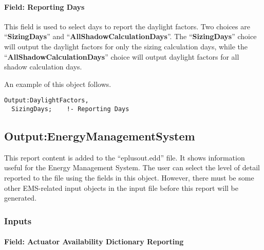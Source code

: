 \paragraph{Field: Reporting Days}\label{field-reporting-days}

This field is used to select days to report the daylight factors. Two choices are ``\textbf{SizingDays}'' and ``\textbf{AllShadowCalculationDays}''. The ``\textbf{SizingDays}'' choice will output the daylight factors for only the sizing calculation days, while the ``\textbf{AllShadowCalculationDays}'' choice will output daylight factors for all shadow calculation days.

An example of this object follows.

\begin{lstlisting}
Output:DaylightFactors,
  SizingDays;    !- Reporting Days
\end{lstlisting}

\subsection{Output:EnergyManagementSystem}\label{outputenergymanagementsystem}

This report content is added to the ``eplusout.edd'' file. It shows information useful for the Energy Management System. The user can select the level of detail reported to the file using the fields in this object. However, there must be some other EMS-related input objects in the input file before this report will be generated.

\subsubsection{Inputs}\label{inputs-5-024}

\paragraph{Field: Actuator Availability Dictionary Reporting}\label{field-actuator-availability-dictionary-reporting}

